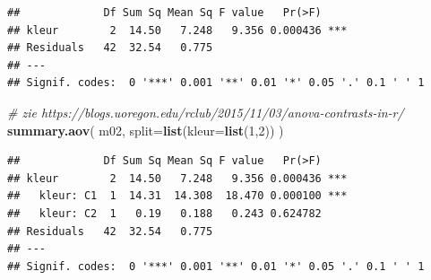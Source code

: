 \documentclass[
]{book}
\newenvironment{Shaded}{\begin{snugshade}}{\end{snugshade}}
\newcommand{\AttributeTok}[1]{\textcolor[rgb]{0.13,0.29,0.53}{#1}}
\newcommand{\CommentTok}[1]{\textcolor[rgb]{0.56,0.35,0.01}{\textit{#1}}}
\newcommand{\DecValTok}[1]{\textcolor[rgb]{0.00,0.00,0.81}{#1}}
\newcommand{\FunctionTok}[1]{\textcolor[rgb]{0.13,0.29,0.53}{\textbf{#1}}}
\newcommand{\NormalTok}[1]{#1}
\newcommand{\OtherTok}[1]{\textcolor[rgb]{0.56,0.35,0.01}{#1}}
\newcommand{\SpecialCharTok}[1]{\textcolor[rgb]{0.81,0.36,0.00}{\textbf{#1}}}
\newcommand{\StringTok}[1]{\textcolor[rgb]{0.31,0.60,0.02}{#1}}
\begin{document}
\begin{Shaded}
\end{Shaded}

\begin{verbatim}
##             Df Sum Sq Mean Sq F value   Pr(>F)    
## kleur        2  14.50   7.248   9.356 0.000436 ***
## Residuals   42  32.54   0.775                     
## ---
## Signif. codes:  0 '***' 0.001 '**' 0.01 '*' 0.05 '.' 0.1 ' ' 1
\end{verbatim}

\begin{Shaded}
\begin{Highlighting}[]
\CommentTok{\# zie https://blogs.uoregon.edu/rclub/2015/11/03/anova{-}contrasts{-}in{-}r/}
\FunctionTok{summary.aov}\NormalTok{( m02, }\AttributeTok{split=}\FunctionTok{list}\NormalTok{(}\AttributeTok{kleur=}\FunctionTok{list}\NormalTok{(}\DecValTok{1}\NormalTok{,}\DecValTok{2}\NormalTok{)) )}
\end{Highlighting}
\end{Shaded}

\begin{verbatim}
##             Df Sum Sq Mean Sq F value   Pr(>F)    
## kleur        2  14.50   7.248   9.356 0.000436 ***
##   kleur: C1  1  14.31  14.308  18.470 0.000100 ***
##   kleur: C2  1   0.19   0.188   0.243 0.624782    
## Residuals   42  32.54   0.775                     
## ---
## Signif. codes:  0 '***' 0.001 '**' 0.01 '*' 0.05 '.' 0.1 ' ' 1
\end{verbatim}
\end{document}
